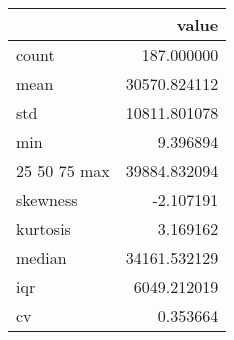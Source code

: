 \begin{tabular}{lr}
\toprule
 & value \\
\midrule
count & 187.000000 \\
mean & 30570.824112 \\
std & 10811.801078 \\
min & 9.396894 \\
25%
50%
75%
max & 39884.832094 \\
skewness & -2.107191 \\
kurtosis & 3.169162 \\
median & 34161.532129 \\
iqr & 6049.212019 \\
cv & 0.353664 \\
\bottomrule
\end{tabular}

